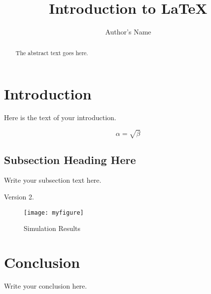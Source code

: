 \documentclass{article}
\begin{document}
\title{Introduction to \LaTeX{}}
\author{Author's Name}

\maketitle

\begin{abstract}
The abstract text goes here.
\end{abstract}

\section{Introduction}
Here is the text of your introduction.

\begin{equation}
    \label{simple_equation}
    \alpha = \sqrt{ \beta }
\end{equation}

\subsection{Subsection Heading Here}
Write your subsection text here.

Version 2.

\begin{figure}
    \centering
    \texttt{[image: myfigure]}
    \caption{Simulation Results}
    \label{simulationfigure}
\end{figure}

\section{Conclusion}
Write your conclusion here.
\end{document}
